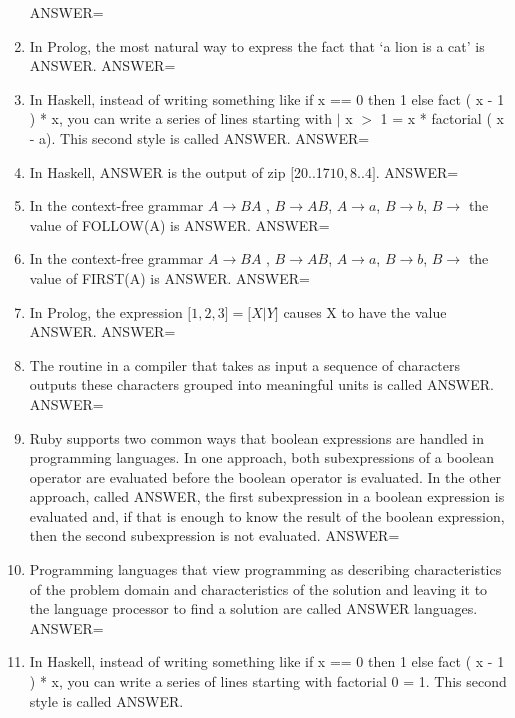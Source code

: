 \documentclass{exam}
\begin{document}
\begin{enumerate}
ANSWER=
\item In Prolog, the most natural way to express the fact that `a lion is a cat' is ANSWER.\newline
ANSWER=
\item In Haskell, instead of writing something like if x == 0 then 1 else fact ( x - 1 ) * x, you can write a series of lines starting with $|$ x $>$ 1 = x * factorial ( x - a).  This second style is called ANSWER.\newline
ANSWER=
\item In Haskell, ANSWER is the output of zip $\lbrack$20..17\rbrack$ $\lbrack$10,8..4\rbrack$.\newline
ANSWER=
\item In the context-free grammar $A \rightarrow B A$ , $B \rightarrow A B$, $A \rightarrow a$, $B \rightarrow b$, $B \rightarrow$  the value of FOLLOW(A) is ANSWER.\newline
ANSWER=
\item In the context-free grammar $A \rightarrow B A$ , $B \rightarrow A B$, $A \rightarrow a$, $B \rightarrow b$, $B \rightarrow$  the value of FIRST(A) is ANSWER.\newline
ANSWER=
\item In Prolog, the expression $\lbrack 1, 2, 3\rbrack = \lbrack X | Y\rbrack$ causes X to have the value ANSWER.\newline
ANSWER=
\item The routine in a compiler that takes as input a sequence of characters outputs these characters grouped into meaningful units is called ANSWER.\newline
ANSWER=
\item Ruby supports two common ways that boolean expressions are handled in programming languages.  In one approach, both subexpressions of a boolean operator are evaluated before the boolean operator is evaluated.  In the other approach, called ANSWER, the first subexpression in a boolean expression is evaluated and, if that is enough to know the result of the boolean expression, then the second subexpression is not evaluated.\newline
ANSWER=
\item Programming languages that view programming as describing characteristics of the problem domain and characteristics of the solution and leaving it to the language processor to find a solution are called ANSWER languages.\newline
ANSWER=
\item In Haskell, instead of writing something like if x == 0 then 1 else fact ( x - 1 ) * x, you can write a series of lines starting with factorial 0 = 1.  This second style is called ANSWER.\newline

\end{enumerate}
\end{document}
